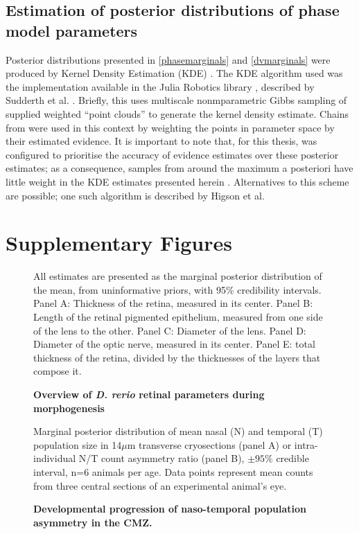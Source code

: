 \subsection{Estimation of posterior distributions of phase model parameters}
\label{ssec:GMCkde}
Posterior distributions presented in \autoref{phasemarginals} and \autoref{dvmarginals} were produced by Kernel Density Estimation (KDE) \cite[p. 122]{Bishop2006}. The KDE algorithm used was the implementation available in the Julia Robotics library , described by Sudderth et al. \cite{Sudderth2010}. Briefly, this uses multiscale nonmparametric Gibbs sampling of supplied weighted ``point clouds'' to generate the kernel density estimate. Chains from  were used in this context by weighting the points in parameter space by their estimated evidence. It is important to note that, for this thesis,  was configured to prioritise the accuracy of evidence estimates over these posterior estimates; as a consequence, samples from around the maximum a posteriori have little weight in the KDE estimates presented herein \cite{Higson2018}. Alternatives to this scheme are possible; one such algorithm is described by Higson et al. \cite{Higson2019}

\section{Supplementary Figures}

\begin{figure}[!h]
    \caption{{\bf Overview of \textit{D. rerio} retinal parameters during morphogenesis}}
    All estimates are presented as the marginal posterior distribution of the mean, from uninformative priors, with 95\% credibility intervals.
    Panel A: Thickness of the retina, measured in its center.
    Panel B: Length of the retinal pigmented epithelium, measured from one side of the lens to the other.
    Panel C: Diameter of the lens.
    Panel D: Diameter of the optic nerve, measured in its center.
    Panel E: total thickness of the retina, divided by the thicknesses of the layers that compose it.
    \label{morphology}
\end{figure}

\begin{figure}[!h]
    \caption{{\bf Developmental progression of naso-temporal population asymmetry in the CMZ.}}
    Marginal posterior distribution of mean nasal (N) and temporal (T) population size in 14$\mu$m transverse cryosections (panel A) or intra-individual N/T count asymmetry ratio (panel B), $\pm 95\%$ credible interval, n=6 animals per age. Data points represent mean counts from three central sections of an experimental animal's eye. 
    \label{NTontology}
\end{figure}


